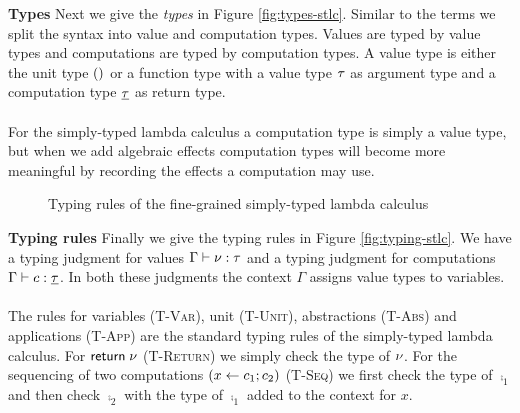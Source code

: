 {\textbf{Types}
Next we give the \emph{types} in Figure \ref{fig:types-stlc}.
Similar to the terms we split the syntax into value and computation types.
Values are typed by value types and computations are typed by computation types.
A value type is either the unit type $()$ or a function type with a value type $\tau$ as argument type and a computation type  $\underline{\tau}$ as return type.
\\\\
For the simply-typed lambda calculus a computation type is simply a value type, but when we add algebraic effects computation types will become more meaningful by recording the effects a computation may use.

\begin{figure}
\caption{Typing rules of the fine-grained simply-typed lambda calculus}
\centering
{}
\end{figure}

\textbf{Typing rules}
Finally we give the typing rules in Figure \ref{fig:typing-stlc}.
We have a typing judgment for values $\Gamma \vdash \nu : \tau$ and a typing judgment for computations $\Gamma \vdash c : \underline{\tau}$.
In both these judgments the context $\Gamma$ assigns value types to variables.
\\\\
The rules for variables ({\footnotesize\textsc{T-Var}}), unit ({\footnotesize\textsc{T-Unit}}), abstractions ({\footnotesize\textsc{T-Abs}}) and applications ({\footnotesize\textsc{T-App}}) are the standard typing rules of the simply-typed lambda calculus.
For $\mathsf{return} \; \nu$ ({\footnotesize\textsc{T-Return}}) we simply check the type of $\nu$.
For the sequencing of two computations $(x \leftarrow c_1 ; c_2)$ ({\footnotesize\textsc{T-Seq}}) we first check the type of $\comp_1$ and then check $\comp_2$ with the type of $\comp_1$ added to the context for $x$.

}
